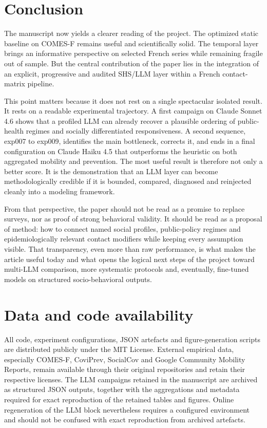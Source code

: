 \documentclass[ROIA,Unicode]{cedram}
\begin{document}
\section{Conclusion}
The manuscript now yields a clearer reading of the project. The optimized static baseline on COMES-F remains useful and scientifically solid. The temporal layer brings an informative perspective on selected French series while remaining fragile out of sample. But the central contribution of the paper lies in the integration of an explicit, progressive and audited SHS/LLM layer within a French contact-matrix pipeline.

This point matters because it does not rest on a single spectacular isolated result. It rests on a readable experimental trajectory. A first campaign on Claude Sonnet 4.6 shows that a profiled LLM can already recover a plausible ordering of public-health regimes and socially differentiated responsiveness. A second sequence, exp007 to exp009, identifies the main bottleneck, corrects it, and ends in a final configuration on Claude Haiku 4.5 that outperforms the heuristic on both aggregated mobility and prevention. The most useful result is therefore not only a better score. It is the demonstration that an LLM layer can become methodologically credible if it is bounded, compared, diagnosed and reinjected cleanly into a modeling framework.

From that perspective, the paper should not be read as a promise to replace surveys, nor as proof of strong behavioral validity. It should be read as a proposal of method: how to connect named social profiles, public-policy regimes and epidemiologically relevant contact modifiers while keeping every assumption visible. That transparency, even more than raw performance, is what makes the article useful today and what opens the logical next steps of the project toward multi-LLM comparison, more systematic protocols and, eventually, fine-tuned models on structured socio-behavioral outputs.



\section*{Data and code availability}
All code, experiment configurations, JSON artefacts and figure-generation scripts are distributed publicly under the MIT License. External empirical data, especially COMES-F, CoviPrev, SocialCov and Google Community Mobility Reports, remain available through their original repositories and retain their respective licenses. The LLM campaigns retained in the manuscript are archived as structured JSON outputs, together with the aggregations and metadata required for exact reproduction of the retained tables and figures. Online regeneration of the LLM block nevertheless requires a configured environment and should not be confused with exact reproduction from archived artefacts.
\end{document}
